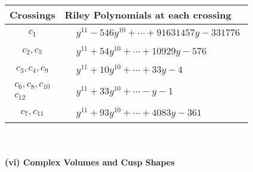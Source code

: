 \documentclass[1p]{elsarticle_modified}
\theoremstyle{definition}
\begin{document}
\begin{tabular}{m{50pt}|m{274pt}}
Crossings & \hspace{64pt}Riley Polynomials at each crossing \\
\hline $$\begin{aligned}c_{1}\end{aligned}$$&$\begin{aligned}
&y^{11}-546 y^{10}+\cdots+91631457 y-331776
\end{aligned}$\\
\hline $$\begin{aligned}c_{2},c_{5}\end{aligned}$$&$\begin{aligned}
&y^{11}+54 y^{10}+\cdots+10929 y-576
\end{aligned}$\\
\hline $$\begin{aligned}c_{3},c_{4},c_{9}\end{aligned}$$&$\begin{aligned}
&y^{11}+10 y^{10}+\cdots+33 y-4
\end{aligned}$\\
\hline $$\begin{aligned}c_{6},c_{8},c_{10}\\c_{12}\end{aligned}$$&$\begin{aligned}
&y^{11}+33 y^{10}+\cdots- y-1
\end{aligned}$\\
\hline $$\begin{aligned}c_{7},c_{11}\end{aligned}$$&$\begin{aligned}
&y^{11}+93 y^{10}+\cdots+4083 y-361
\end{aligned}$\\
\hline
\end{tabular}\\~\\
\newpage\flushleft \textbf{(vi) Complex Volumes and Cusp Shapes}
\end{document}
